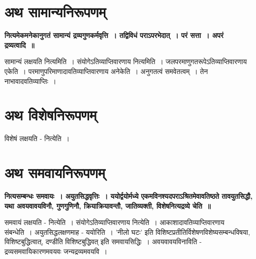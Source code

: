 \section*{अथ सामान्यनिरूपणम्}
	{\bfseries नित्यमेकमनेकानुगतं सामान्यं द्रव्यगुणकर्मवृत्ति~। तद्विविधं पराऽपरभेदात्~। परं सत्ता~। अपरं द्रव्यत्वादि~॥}\par
		सामान्यं लक्षयति नित्यमिति~। संयोगेऽतिव्याप्तिवारणाय नित्यमिति~। जलपरमाणुगतरूपेऽतिव्याप्तिवारणाय एकेति~। परमाणुपरिमाणादावतिव्याप्तिवारणाय अनेकेति~। अनुगतत्वं समवेतत्वम्~। तेन नाभावादवतिव्याप्तिः~।\\[10pt]
\section*{अथ विशेषनिरूपणम्}
\par
		विशेषं लक्षयति - नित्येति~।\\
\section*{अथ समवायनिरूपणम्}
	{\bfseries नित्यसम्बन्धः समवायः~। अयुतसिद्धवृत्तिः~। ययोर्द्वयोर्मध्ये एकमविनश्यदपराऽश्रितमेवावतिष्ठते तावयुतसिद्धौ, यथा अवयवावयविनौ, गुणगुणिनौ, क्रियाक्रियावन्तौ, जातिव्यक्ती, विशेषनित्यद्रव्ये चेति~॥}\par
		समवायं लक्षयति - नित्येति~। संयोगेऽतिव्याप्तिवारणाय नित्येति~। आकाशादावतिव्याप्तिवारणाय संबन्धेति~। अयुतसिद्धलक्षणमाह - ययोरिति~। ’नीलो घटः’ इति विशिष्टप्रतीतिर्विशेषणविशेष्यसम्बन्धविषया, विशिष्टबुद्धित्वात्, दण्डीति विशिष्टबुद्धिवत् इति समवायसिद्धिः~। अवयवावयविनाविति - द्रव्यसमवायिकारणमवयवः जन्यद्रव्यमवयवि~।\\
